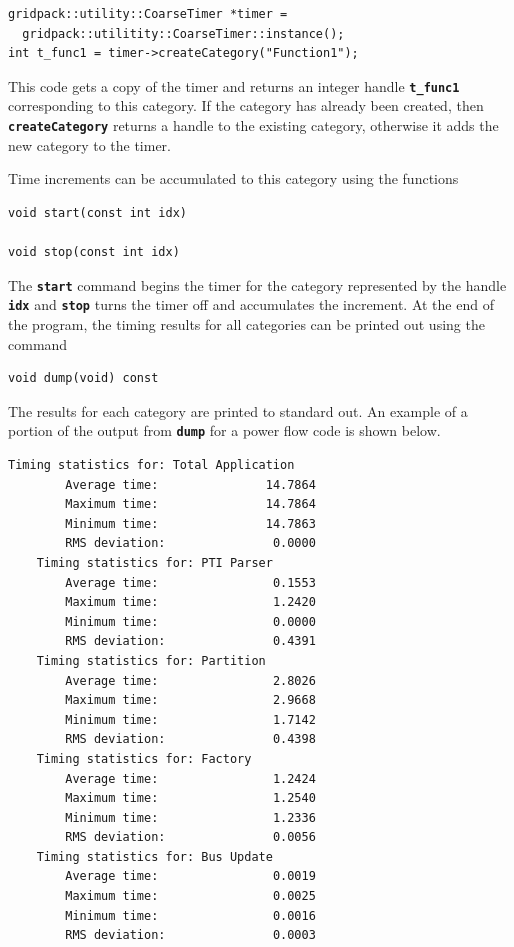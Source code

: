 \documentclass[12pt]{report} %
\begin{document}
{
\color{red}
\begin{Verbatim}[fontseries=b]
gridpack::utility::CoarseTimer *timer =
  gridpack::utilitity::CoarseTimer::instance();
int t_func1 = timer->createCategory("Function1");
\end{Verbatim}
}

This code gets a copy of the timer and returns an integer handle \texttt{\textbf{t\_func1}} corresponding to this category. If the category has already been created, then \texttt{\textbf{createCategory}} returns a handle to the existing category, otherwise it adds the new category to the timer.

Time increments can be accumulated to this category using the functions

{
\color{red}
\begin{Verbatim}[fontseries=b]
void start(const int idx)

void stop(const int idx)
\end{Verbatim}
}

The \texttt{\textbf{start}} command begins the timer for the category represented by the handle \texttt{\textbf{idx}} and \texttt{\textbf{stop}} turns the timer off and accumulates the increment.
At the end of the program, the timing results for all categories can be printed out using the command

{
\color{red}
\begin{Verbatim}[fontseries=b]
void dump(void) const
\end{Verbatim}
}

The results for each category are printed to standard out. An example of a portion of the output from \texttt{\textbf{dump}} for a power flow code is shown below.

{
\color{red}
\begin{Verbatim}[fontseries=b]
    Timing statistics for: Total Application
        Average time:               14.7864
        Maximum time:               14.7864
        Minimum time:               14.7863
        RMS deviation:               0.0000
    Timing statistics for: PTI Parser
        Average time:                0.1553
        Maximum time:                1.2420
        Minimum time:                0.0000
        RMS deviation:               0.4391
    Timing statistics for: Partition
        Average time:                2.8026
        Maximum time:                2.9668
        Minimum time:                1.7142
        RMS deviation:               0.4398
    Timing statistics for: Factory
        Average time:                1.2424
        Maximum time:                1.2540
        Minimum time:                1.2336
        RMS deviation:               0.0056
    Timing statistics for: Bus Update
        Average time:                0.0019
        Maximum time:                0.0025
        Minimum time:                0.0016
        RMS deviation:               0.0003
\end{Verbatim}
}
\end{document}
